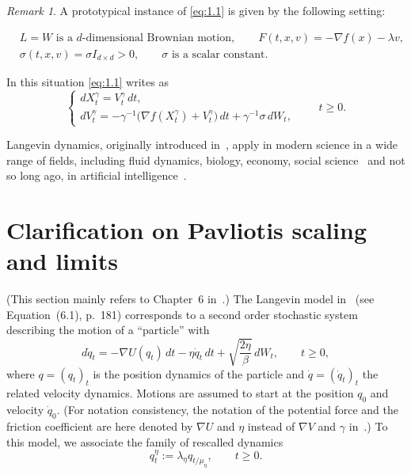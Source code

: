 \documentclass[11pt]{article}
\theoremstyle{remark}
\newtheorem{remark}{Remark}[section]
\begin{document}
\begin{remark}
A prototypical instance of \eqref{eq:1.1} is given by the following setting:

\begin{equation}
    \label{eq:1.2}
    \begin{aligned}
    &L = W \text{ is a $d$-dimensional Brownian motion}, \qquad
    F(t,x,v) = -\nabla f(x) - \lambda v, \\
    &\sigma(t,x,v) = \sigma I_{d\times d} > 0, \qquad \sigma \text{ is a scalar constant}.
    \end{aligned}
\end{equation}

In this situation \eqref{eq:1.1} writes as
\begin{equation}
\label{eq:1.3}
\begin{cases}
dX_t^{\gamma} = V_t^{\gamma}\,dt,\\
dV_t^{\gamma} = -\gamma^{-1}\bigl(\nabla f(X_t^{\gamma}) + V_t^{\gamma}\bigr)\,dt + \gamma^{-1}\sigma\,dW_t,
\end{cases}
\qquad t\ge0.
\end{equation}
\end{remark}

Langevin dynamics, originally introduced in~\cite{l08}, apply in modern science in a wide range of fields, including
fluid dynamics, biology, economy, social science~\cite{pt13,naldi10} and not so long ago, in artificial intelligence~\cite{ccb18}.

\section{Clarification on Pavliotis \texorpdfstring{\cite{p14}}{} scaling and limits}

(This section mainly refers to Chapter~6 in~\cite{p14}.) The Langevin model in~\cite{p14} (see Equation~(6.1), p.~181)
corresponds to a second order stochastic system describing the motion of a ``particle'' with
\[
d\dot{q}_t = -\nabla U(q_t)\,dt - \eta\dot{q}_t\,dt + \sqrt{\frac{2\eta}{\beta}}\,dW_t,
\qquad t\ge0,
\]
where $q=(q_t)_t$ is the position dynamics of the particle and $\dot{q}=(\dot{q}_t)_t$ the related velocity dynamics.
Motions are assumed to start at the position $q_0$ and velocity $\dot{q}_0$.
(For notation consistency, the notation of the potential force and the friction coefficient are here denoted by $\nabla U$ and $\eta$
instead of $\nabla V$ and $\gamma$ in~\cite{p14}.) To this model, we associate the family of rescalled dynamics
\[
q_t^{\eta}:=\lambda_{\eta}q_{t/\mu_{\eta}}, \qquad t\ge0.
\]
\end{document}
